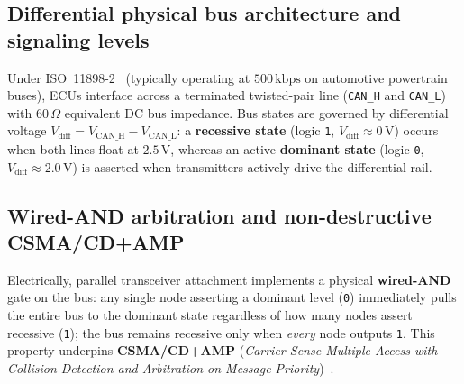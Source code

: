 \documentclass[12pt, a4paper, reqno, oneside]{book}
\DeclareRobustCommand{\code}[1]{\nolinkurl{#1}}
\begin{document}
\subsection{Differential physical bus architecture and signaling levels}
Under ISO~11898-2~\cite{iso11898_2_2016} (typically operating at $500\,\text{kbps}$ on automotive powertrain buses), ECUs interface across a terminated twisted-pair line (\code{CAN_H} and \code{CAN_L}) with $60\,\Omega$ equivalent DC bus impedance. Bus states are governed by differential voltage $V_{\text{diff}} = V_{\text{CAN\_H}} - V_{\text{CAN\_L}}$: a \textbf{recessive state} (logic \texttt{1}, $V_{\text{diff}} \approx 0\,\text{V}$) occurs when both lines float at $2.5\,\text{V}$, whereas an active \textbf{dominant state} (logic \texttt{0}, $V_{\text{diff}} \approx 2.0\,\text{V}$) is asserted when transmitters actively drive the differential rail.

\subsection{Wired-AND arbitration and non-destructive CSMA/CD+AMP}
Electrically, parallel transceiver attachment implements a physical \textbf{wired-AND} gate on the bus: any single node asserting a dominant level (\texttt{0}) immediately pulls the entire bus to the dominant state regardless of how many nodes assert recessive (\texttt{1}); the bus remains recessive only when \emph{every} node outputs \texttt{1}. This property underpins \textbf{\mbox{CSMA/CD+AMP}} (\textit{Carrier Sense Multiple Access with Collision Detection and Arbitration on Message Priority})~\cite{bosch1991can,iso11898_1_2015}.
\end{document}
